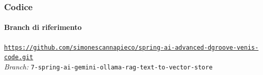 %
\begin{frame}[fragile] \frametitle{Codice}
    \framesubtitle{Branch di riferimento}
	\begin{center}
		{\scriptsize \href{https://github.com/simonescannapieco/spring-ai-advanced-dgroove-venis-code.git}{\texttt{https://github.com/simonescannapieco/spring-ai-advanced-dgroove-venis-code.git}}}\\
		\textit{Branch:} \alert{\texttt{7-spring-ai-gemini-ollama-rag-text-to-vector-store}}
	\end{center}
\end{frame}
